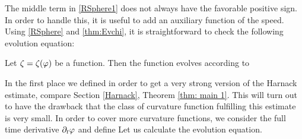\documentclass{amsart}
\begin{document}

The middle term in \cref{RSphere1} does not always have the favorable positive sign. In order to handle this, it is useful to add an auxiliary function of the speed. Using \cref{RSphere} and  \cref{thm:Evchi}, it is straightforward to check the following evolution equation:

\begin{lemma}
Let $\zeta=\zeta(\varphi)$ be a function. Then the function
evolves according to
\end{lemma}

In the first place we defined
in order to get a very strong version of the Harnack estimate, compare Section \ref{Harnack}, Theorem \ref{thm: main 1}. This will turn out to have the drawback that the class of curvature function fulfilling this estimate is very small. In order to cover more curvature functions, we consider the full time derivative $\partial_t\varphi$ and define
Let us calculate the evolution equation.
\end{document}
